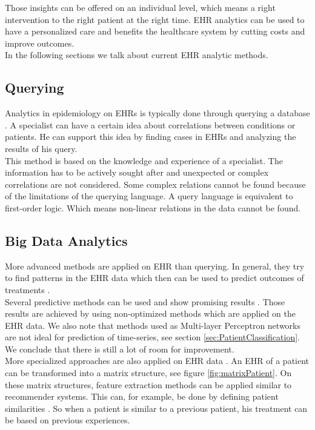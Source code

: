 Those insights can be offered on an individual level, which means a right intervention to the right patient at the right time. EHR analytics can be used to have a personalized care and benefits the healthcare system by cutting costs and improve outcomes. \\

In the following sections we talk about current EHR analytic methods.


\subsection{Querying}

Analytics in epidemiology on EHRs is typically done through querying a database \cite{EHRquery:journal}. A specialist can have a certain idea about correlations between conditions or patients. He can support this idea by finding cases in EHRs and analyzing the results of his query. \\
This method is based on the knowledge and experience of a specialist. The information has to be actively sought after and unexpected or complex correlations are not considered. Some complex relations cannot be found because of the limitations of the querying language. A query language is equivalent to first-order logic. Which means non-linear relations in the data cannot be found.

\subsection{Big Data Analytics}

More advanced methods are applied on EHR than querying. In general, they try to find patterns in the EHR data which then can be used to predict outcomes of treatments \cite{EHRbigdata:slides}. \\

Several predictive methods can be used and show promising results \cite{EHRmining:article}. Those results are achieved by using non-optimized methods which are applied on the EHR data. We also note that methods used as Multi-layer Perceptron networks are not ideal for prediction of time-series, see section \ref{sec:PatientClassification}. We conclude that there is still a lot of room for improvement. \\
 
More specialized approaches are also applied on EHR data \cite{EHRrecommender:article}. 
An EHR of a patient can be transformed into a matrix structure, see figure \ref{fig:matrixPatient}. On these matrix structures, feature extraction methods can be applied similar to recommender systems. This can, for example, be done by defining patient similarities \cite{EHRsimilarity:article}. So when a patient is similar to a previous patient, his treatment can be based on previous experiences.

